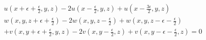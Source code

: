 \documentclass{article}
\begin{document}
\begin{eqnarray}
u(x+\epsilon+\frac{\epsilon}{2},y,z) -2u(x-\frac{\epsilon}{2},y,z)+u(x-\frac{3\epsilon}{2},y,z)\nonumber\\
w(x,y,z+\epsilon+\frac{\epsilon}{2})-2w(x,y,z-\frac{\epsilon}{2})+w(x,y,z-\epsilon-\frac{\epsilon}{2})\nonumber\\
+v(x,y+\epsilon+\frac{\epsilon}{2},y,z)-2v(x,y-\frac{\epsilon}{2},z)+v(x,y-\epsilon-\frac{\epsilon}{2},z)=0
\end{eqnarray}
\end{document}
